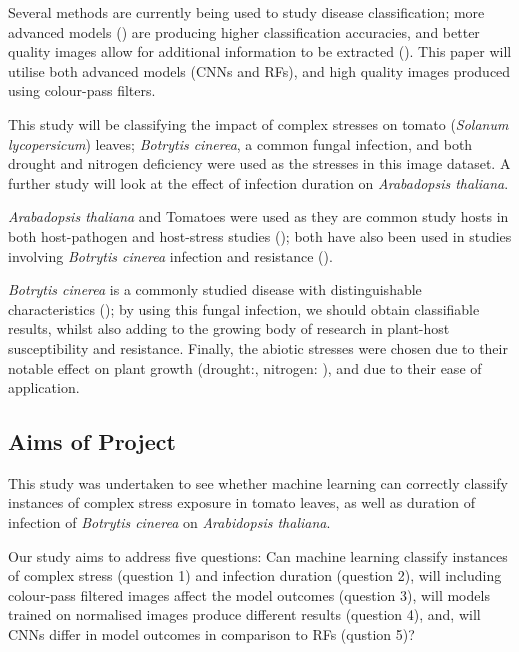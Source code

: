 \documentclass[../../Paper.tex]{subfiles}
\begin{document}
Several methods are currently being used to study disease classification; more advanced models (\cite{zhu_early_2016}) are producing higher classification accuracies, and better quality images allow for additional information to be extracted (\cite{baranowski_hyperspectral_2015,lowe_hyperspectral_2017}). This paper will utilise both advanced models (CNNs and RFs), and high quality images produced using colour-pass filters.

This study will be classifying the impact of complex stresses on tomato (\textit{Solanum lycopersicum}) leaves; \textit{Botrytis cinerea}, a common fungal infection, and both drought and nitrogen deficiency were used as the stresses in this image dataset. A further study will look at the effect of infection duration on \textit{Arabadopsis thaliana}.

\textit{Arabadopsis thaliana} and Tomatoes were used as they are common study hosts in both host-pathogen and host-stress studies (\cite{tank_salinity-resistant_2010,singh_machine_2016,choi_positive_2017}); both have also been used in studies involving \textit{Botrytis cinerea} infection and resistance (\cite{diaz_role_2002,choi_positive_2017}).


\textit{Botrytis cinerea} is a commonly studied disease with distinguishable characteristics (\cite{awate_fruit_2015}); by using this fungal infection, we should obtain classifiable results, whilst also adding to the growing body of research in plant-host susceptibility and resistance. Finally, the abiotic stresses were chosen due to their notable effect on plant growth (drought:\cite{santos_path_2018}, nitrogen: \cite{zhao_nitrogen_2005}), and due to their ease of application. 


\subsection*{Aims of Project}


    This study was undertaken to see whether machine learning can correctly classify instances of complex stress 
    exposure in tomato leaves, as well as duration of infection of \textit{Botrytis cinerea} on \textit{Arabidopsis thaliana}.

    Our study aims to address five questions: Can machine learning classify instances of complex stress (question 1) and infection duration (question 2), will including colour-pass filtered images affect the model outcomes (question 3), will models trained on normalised images produce different results (question 4), and, will CNNs differ in model outcomes in comparison to RFs (qustion 5)?
    
\end{document}
